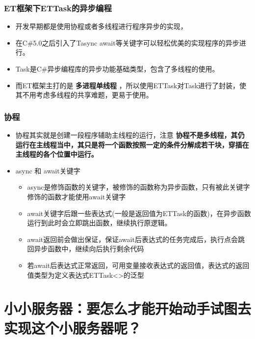 \documentclass[9pt, b5paper]{article}
\begin{document}
\subsubsection{ET框架下ETTask的异步编程}
\label{sec-1-2-2}
\begin{itemize}
\item 开发早期都是使用协程或者多线程进行程序异步的实现，
\item 在C\#5.0之后引入了Tasync await等关键字可以轻松优美的实现程序的异步进行。
\item Task是C\#异步编程库的异步功能基础类型，包含了多线程的使用。
\item 而ET框架主打的是 \textbf{多进程单线程} ，所以使用ETTask对Task进行了封装，使其不用考虑多线程的共享难题，更易于使用。
\end{itemize}
\subsubsection{协程}
\label{sec-1-2-3}
\begin{itemize}
\item 协程其实就是创建一段程序辅助主线程的运行，注意 \textbf{协程不是多线程，其仍运行在主线程当中，其只是将一个函数按照一定的条件分解成若干块，穿插在主线程的各个位置中运行。}
\item async 和 await关键字
\begin{itemize}
\item async是修饰函数的关键字，被修饰的函数称为异步函数，只有被此关键字修饰的函数才能使用await关键字
\item await关键字后跟一些表达式(一般是返回值为ETTask的函数)，在异步函数运行到此时会立即跳出函数，继续执行原逻辑。
\item await返回前会做出保证，保证await后表达式的任务完成后，执行点会跳回异步函数中，继续向后执行剩余代码
\item 若await后表达式正常返回，可用变量接收表达式的返回值，表达式的返回值类型为定义表达式ETTask<>的泛型
\end{itemize}
\end{itemize}

\section{小小服务器：要怎么才能开始动手试图去实现这个小服务器呢？}
\label{sec-2}
\end{document}
